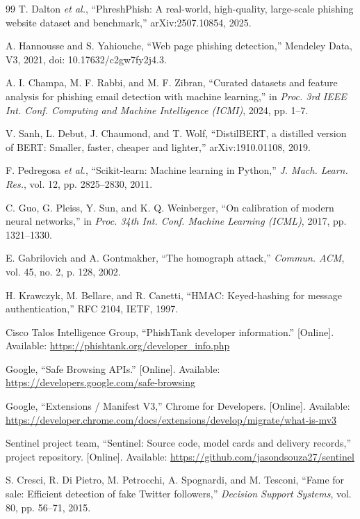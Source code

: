 \begin{thebibliography}{99}
 T. Dalton \textit{et al.}, ``PhreshPhish: A real-world, high-quality, large-scale phishing website dataset and benchmark,'' arXiv:2507.10854, 2025.

 A. Hannousse and S. Yahiouche, ``Web page phishing detection,'' Mendeley Data, V3, 2021, doi: 10.17632/c2gw7fy2j4.3.

 A. I. Champa, M. F. Rabbi, and M. F. Zibran, ``Curated datasets and feature analysis for phishing email detection with machine learning,'' in \textit{Proc. 3rd IEEE Int. Conf. Computing and Machine Intelligence (ICMI)}, 2024, pp. 1--7.

 V. Sanh, L. Debut, J. Chaumond, and T. Wolf, ``DistilBERT, a distilled version of BERT: Smaller, faster, cheaper and lighter,'' arXiv:1910.01108, 2019.

 F. Pedregosa \textit{et al.}, ``Scikit-learn: Machine learning in Python,'' \textit{J. Mach. Learn. Res.}, vol. 12, pp. 2825--2830, 2011.

 C. Guo, G. Pleiss, Y. Sun, and K. Q. Weinberger, ``On calibration of modern neural networks,'' in \textit{Proc. 34th Int. Conf. Machine Learning (ICML)}, 2017, pp. 1321--1330.

 E. Gabrilovich and A. Gontmakher, ``The homograph attack,'' \textit{Commun. ACM}, vol. 45, no. 2, p. 128, 2002.

 H. Krawczyk, M. Bellare, and R. Canetti, ``HMAC: Keyed-hashing for message authentication,'' RFC 2104, IETF, 1997.

 Cisco Talos Intelligence Group, ``PhishTank developer information.'' [Online]. Available: \url{https://phishtank.org/developer_info.php}

 Google, ``Safe Browsing APIs.'' [Online]. Available: \url{https://developers.google.com/safe-browsing}

 Google, ``Extensions / Manifest V3,'' Chrome for Developers. [Online]. Available: \url{https://developer.chrome.com/docs/extensions/develop/migrate/what-is-mv3}

 Sentinel project team, ``Sentinel: Source code, model cards and delivery records,'' project repository. [Online]. Available: \url{https://github.com/jasondsouza27/sentinel}

 S. Cresci, R. Di Pietro, M. Petrocchi, A. Spognardi, and M. Tesconi, ``Fame for sale: Efficient detection of fake Twitter followers,'' \textit{Decision Support Systems}, vol. 80, pp. 56--71, 2015.


\end{thebibliography}
